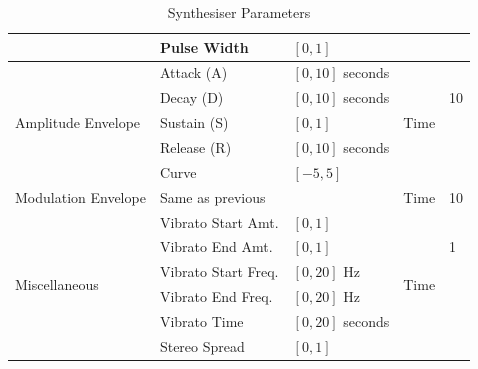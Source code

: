 \documentclass[11pt, oneside]{report}   	%
\begin{document}
\begin{table}[]
\begin{tabular}{|l|l|l|l|l|}
																	  & Pulse Width                & $[0, 1]$                   		&                       			&\\ \hline
		\multirow{5}{*}{Amplitude Envelope}    & Attack (A)       				& $[0, 10]$ seconds        & \multirow{5}{*}{Time}& \multirow{3}{*}{10} \\
																	  & Decay (D)               		& $[0, 10]$ seconds         &                       			&\\
																	  & Sustain (S)             	 	 & $[0, 1]$                   		&                       			&\\
																	  & Release (R)             		& $[0, 10]$ seconds        &                       			&\\
																	  & Curve                   	   	   & $[-5, 5]$                  	&                       			&\\ \hline
		Modulation Envelope        						& Same as previous           &                            			& Time              	& 10									\\ \hline
		\multirow{6}{*}{Miscellaneous}             & Vibrato Start Amt.    		  & $[0, 1]$                   	& \multirow{6}{*}{Time}& \multirow{3}{*}{1} \\
																	  & Vibrato End Amt.	         & $[0, 1]$                   		&                       			&\\
																	  & Vibrato Start Freq.			  & $[0, 20]$ Hz               &                       			&\\
																	  & Vibrato End Freq.		      & $[0, 20]$ Hz               &                       			&\\
																	  & Vibrato Time            		& $[0, 20]$ seconds      &                       			&\\
																	  & Stereo Spread           	  & $[0, 1]$                   		&                       			&\\ \hline
	\end{tabular}
\caption{Synthesiser Parameters}
\label{tab:Params}
\end{table}
\end{document}
